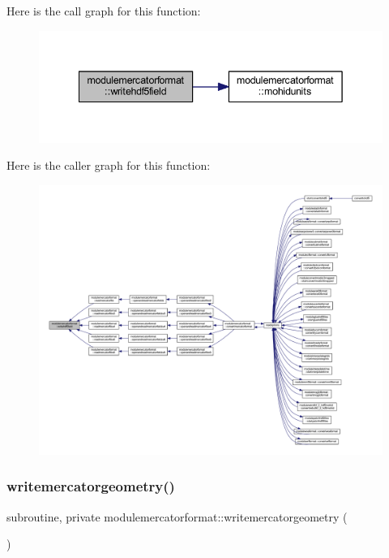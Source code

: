 Here is the call graph for this function\+:\nopagebreak
\begin{figure}[H]
\begin{center}
\leavevmode
\includegraphics[width=342pt]{namespacemodulemercatorformat_a0b4f8793ec9ff2e27a2372febde0eac4_cgraph}
\end{center}
\end{figure}
Here is the caller graph for this function\+:\nopagebreak
\begin{figure}[H]
\begin{center}
\leavevmode
\includegraphics[width=350pt]{namespacemodulemercatorformat_a0b4f8793ec9ff2e27a2372febde0eac4_icgraph}
\end{center}
\end{figure}
\mbox{\label{namespacemodulemercatorformat_a91963802a12780a4b2d6d09497ba91ac}} 
\subsubsection{\texorpdfstring{writemercatorgeometry()}{writemercatorgeometry()}}
{\footnotesize\ttfamily subroutine, private modulemercatorformat\+::writemercatorgeometry (\begin{DoxyParamCaption}{ }\end{DoxyParamCaption})\hspace{0.3cm}{\ttfamily [private]}}

